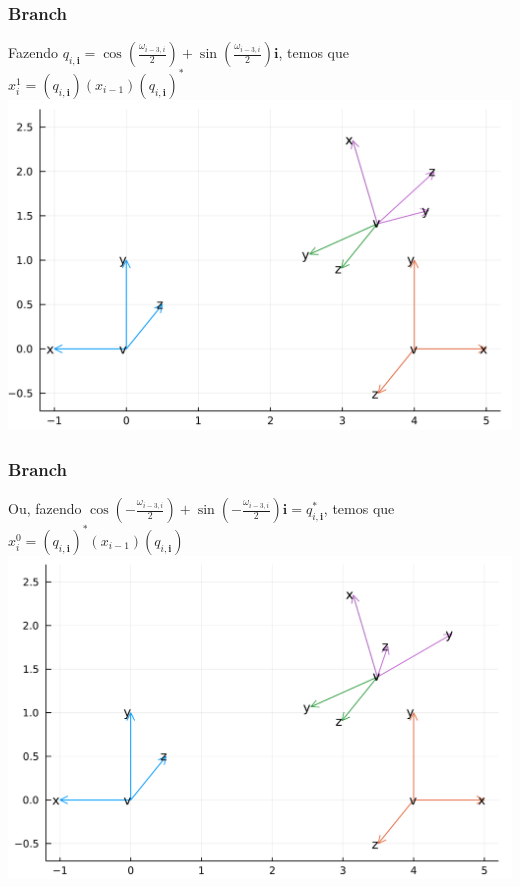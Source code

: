 \documentclass[10pt]{beamer}
\theoremstyle{plain}
\theoremstyle{definition}
\begin{document}
	\begin{frame}
		\frametitle{\normalsize Branch} 
		{
			\begin{center}
				Fazendo $q_{i,\mathbf i} =  \cos(\frac {\omega_{i-3, i}} 2) + \sin(\frac {\omega_{i-3, i}} 2) \mathbf i$, temos que\\
				\vspace{0.2cm}
				$x_i^1 = (q_{i,\mathbf i})(x_{i-1})(q_{i,\mathbf i})^*$
				\\
				
				\vspace{0.5cm}
				\includegraphics[width=0.8\linewidth]{6.png}
			\end{center}
		}	
	\end{frame}

	\begin{frame}
		\frametitle{\normalsize Branch} 
		{
			\begin{center}
				Ou, fazendo  $\cos(-\frac {\omega_{i-3, i}} 2) + \sin(-\frac {\omega_{i-3, i}} 2) \mathbf i = q_{i,\mathbf i}^*$, temos que\\
				\vspace{0.2cm}
				$x_i^0 = (q_{i,\mathbf i})^*(x_{i-1})(q_{i,\mathbf i})$
				\\
				
				\vspace{0.5cm}
				\includegraphics[width=0.8\linewidth]{6n.png}
			\end{center}
		}	
	\end{frame}
\end{document}
